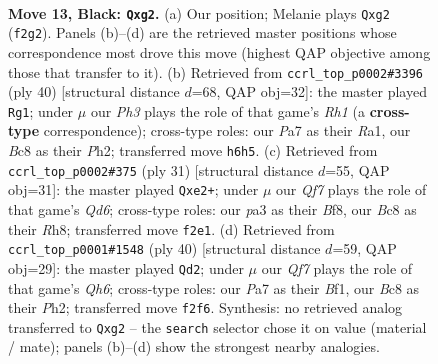 \documentclass[11pt]{article}
\begin{document}
\clearpage

\begin{figure}[p]\centering
\begin{subfigure}{0.46\textwidth}\centering
\resizebox{\linewidth}{!}{%
\newchessgame
\chessboard[
  setfen={1rb1k2r/p1pp1pp1/2p4p/8/4P3/P2B4/P1P2qPP/R1QKR3 b k - 1 13},
  showmover=false,
  pgfstyle=straightmove, color=movearrow, markmove={f2-g2}
]}
\caption{}
\end{subfigure}\hfill
\begin{subfigure}{0.46\textwidth}\centering
\resizebox{\linewidth}{!}{%
\newchessgame
\chessboard[
  setfen={2kr3r/1q3pQp/4p3/2p3P1/1b6/pP2B3/P1P2P1P/R4K1R w - - 0 21},
  showmover=false,
  pgfstyle=straightmove, color=movearrow, markmove={h1-g1}
]}
\caption{}
\end{subfigure}
\\[4pt]
\begin{subfigure}{0.46\textwidth}\centering
\resizebox{\linewidth}{!}{%
\newchessgame
\chessboard[
  setfen={r3kb1r/5p1p/p1p1pp2/8/2p5/2PqB3/PP2QPPP/3RK2R b Kkq - 3 16},
  showmover=false,
  pgfstyle=straightmove, color=movearrow, markmove={d3-e2}
]}
\caption{}
\end{subfigure}\hfill
\begin{subfigure}{0.46\textwidth}\centering
\resizebox{\linewidth}{!}{%
\newchessgame
\chessboard[
  setfen={r4qkr/ppp4p/2np2pQ/5b2/2P5/2N2P2/PP4PP/R3KB1R w - - 3 21},
  showmover=false,
  pgfstyle=straightmove, color=movearrow, markmove={h6-d2}
]}
\caption{}
\end{subfigure}
\caption{\textbf{Move 13, Black: \texttt{Qxg2}.} (a) Our position; Melanie plays \texttt{Qxg2} (\texttt{f2g2}). Panels (b)--(d) are the retrieved master positions whose correspondence most drove this move (highest QAP objective among those that transfer to it). (b) Retrieved from \texttt{ccrl\_top\_p0002\#3396} (ply 40) [structural distance $d$=68, QAP obj=32]: the master played \texttt{Rg1}; under $\mu$ our \emph{Ph3} plays the role of that game's \emph{Rh1} (a \textbf{cross-type} correspondence); cross-type roles: our \emph{P}a7 as their \emph{R}a1, our \emph{B}c8 as their \emph{P}h2; transferred move \texttt{h6h5}. (c) Retrieved from \texttt{ccrl\_top\_p0002\#375} (ply 31) [structural distance $d$=55, QAP obj=31]: the master played \texttt{Qxe2+}; under $\mu$ our \emph{Qf7} plays the role of that game's \emph{Qd6}; cross-type roles: our \emph{p}a3 as their \emph{B}f8, our \emph{B}c8 as their \emph{R}h8; transferred move \texttt{f2e1}. (d) Retrieved from \texttt{ccrl\_top\_p0001\#1548} (ply 40) [structural distance $d$=59, QAP obj=29]: the master played \texttt{Qd2}; under $\mu$ our \emph{Qf7} plays the role of that game's \emph{Qh6}; cross-type roles: our \emph{P}a7 as their \emph{B}f1, our \emph{B}c8 as their \emph{P}h2; transferred move \texttt{f2f6}. Synthesis: no retrieved analog transferred to \texttt{Qxg2} -- the \texttt{search} selector chose it on value (material / mate); panels (b)--(d) show the strongest nearby analogies.}
\label{fig:thought-m25}
\end{figure}
\end{document}

